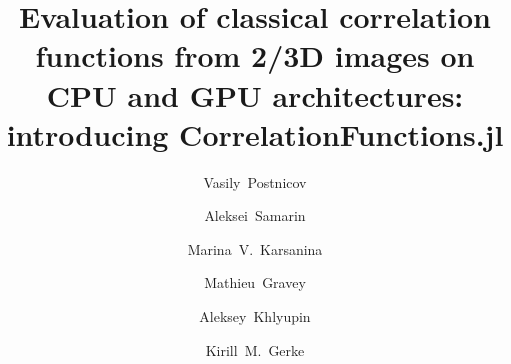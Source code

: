 \documentclass[1p]{elsarticle}
\begin{document}
\begin{frontmatter}
  \title{Evaluation of classical correlation functions from 2/3D images on CPU and
    GPU architectures: introducing CorrelationFunctions.jl}

  \author[Smith]{Vasily~Postnicov}
  \author[Smith,MIT]{Aleksei~Samarin}
  \author[Smith]{Marina~V.~Karsanina}
  \author[Aus]{Mathieu~Gravey}
  \author[MIPT]{Aleksey~Khlyupin}
  \author[Smith]{Kirill~M.~Gerke}

  \address[Smith]{Schmidt Institute of Physics of the Earth of Russian Academy of
    Sciences, Moscow, 107031, Russia}
  \address[MIT]{Computational Mathematics and Cybernetics, Lomonosov Moscow State
    University, Moscow, 119991, Russia}
  \address[Aus]{Institute for Interdisciplinary Mountain Research, Austrian
    Academy of Sciences, Innsbruck, 6020, Austria}
  \address[MIPT]{Moscow Institute of Physics and Technology, Institutskiy Pereulok 9,
    Dolgoprudny, Moscow, Russia 141700}


\end{frontmatter}
\end{document}
